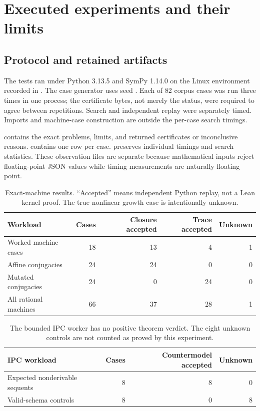 \section{Executed experiments and their limits}
\label{sec:evidence}

\subsection{Protocol and retained artifacts}
The tests ran under Python 3.13.5 and SymPy 1.14.0 on the Linux environment
recorded in . The case generator uses seed
. Each of 82 corpus cases was run three times in one process;
the certificate bytes, not merely the status, were required to agree between
repetitions. Search and independent replay were separately timed. Imports and
machine-case construction are outside the per-case search timings.

 contains the exact problems, limits, and returned
certificates or inconclusive reasons.  contains one row
per case.  preserves individual timings and search statistics.
These observation files are separate because mathematical inputs reject
floating-point JSON values while timing measurements are naturally floating
point.

\begin{table}[ht]
\centering
\begin{tabular}{@{}lrrrr@{}}
\toprule
Workload & Cases & Closure accepted & Trace accepted & Unknown \\
\midrule
Worked machine cases & 18 & 13 & 4 & 1 \\
Affine conjugacies & 24 & 24 & 0 & 0 \\
Mutated conjugacies & 24 & 0 & 24 & 0 \\
\midrule
All rational machines & 66 & 37 & 28 & 1 \\
\bottomrule
\end{tabular}
\caption{Exact-machine results. ``Accepted'' means independent Python replay,
not a Lean kernel proof. The true nonlinear-growth case is intentionally unknown.}
\end{table}

\begin{table}[ht]
\centering
\begin{tabular}{@{}lrrr@{}}
\toprule
IPC workload & Cases & Countermodel accepted & Unknown \\
\midrule
Expected nonderivable sequents & 8 & 8 & 0 \\
Valid-schema controls & 8 & 0 & 8 \\
\bottomrule
\end{tabular}
\caption{The bounded IPC worker has no positive theorem verdict. The eight
unknown controls are not counted as proved by this experiment.}
\end{table}

